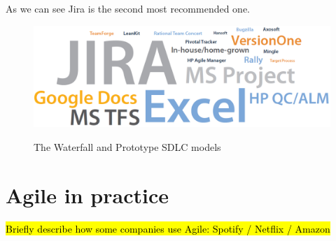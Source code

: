 	As we can see Jira is the second most recommended one.

	\begin{figure}[H]
		\centering
		\includegraphics[width=.8\textwidth]{resources/Untitled_4}\\
		\caption{The Waterfall and Prototype SDLC models}
	\end{figure}

\section{Agile in practice}
\hl{Briefly describe how some companies use Agile: Spotify / Netflix / Amazon}






